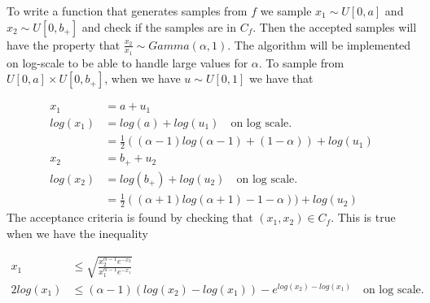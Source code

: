 \documentclass[
]{article}
\begin{document}
To write a function that generates samples from \(f\) we sample
\(x_1\sim U[0,a]\) and \(x_2\sim U[0,b_+]\) and check if the samples are
in \(C_f\). Then the accepted samples will have the property that
\(\frac{x_2}{x_1}\sim Gamma(\alpha, 1)\). The algorithm will be
implemented on log-scale to be able to handle large values for
\(\alpha\). To sample from \(U[0,a]\times U[0,b_+]\), when we have
\(u\sim U[0,1]\) we have that

\[
\begin{aligned}
x_1&=a+u_1\\
log(x_1)&= log(a)+log(u_1)\quad \text{on log scale.}\\
&=\frac{1}{2}((\alpha-1)log(\alpha-1)+(1-\alpha))+log(u_1)\\
x_2&=b_+ +u_2\\
log(x_2) &= log(b_+)+log(u_2)\quad \text{on log scale.}\\
&=\frac{1}{2}((\alpha+1)log(\alpha+1)-1-\alpha))+log(u_2)
\end{aligned}
\] The acceptance criteria is found by checking that
\((x_1, x_2)\in C_f\). This is true when we have the inequality

\[
\begin{aligned}
x_1&\le \sqrt{\frac{x_2^{\alpha-1}e^{-x_2}}{x_1^{\alpha-1}e^{-x_1}}}\\
2log(x_1)&\le(\alpha-1)(log(x_2)-log(x_1))-e^{log(x_2)-log(x_1)} \quad \text{on log scale.}
\end{aligned}
\]
\end{document}
